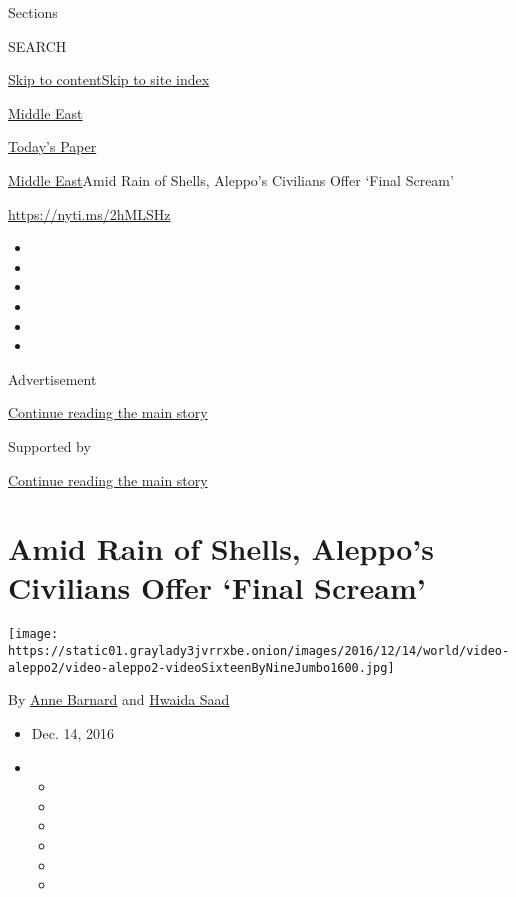 Sections

SEARCH

\protect\hyperlink{site-content}{Skip to
content}\protect\hyperlink{site-index}{Skip to site index}

\href{https://www.nytimes3xbfgragh.onion/section/world/middleeast}{Middle
East}

\href{https://myaccount.nytimes3xbfgragh.onion/auth/login?response_type=cookie\&client_id=vi}{}

\href{https://www.nytimes3xbfgragh.onion/section/todayspaper}{Today's
Paper}

\href{/section/world/middleeast}{Middle East}\textbar{}Amid Rain of
Shells, Aleppo's Civilians Offer `Final Scream'

\url{https://nyti.ms/2hMLSHz}

\begin{itemize}
\item
\item
\item
\item
\item
\item
\end{itemize}

Advertisement

\protect\hyperlink{after-top}{Continue reading the main story}

Supported by

\protect\hyperlink{after-sponsor}{Continue reading the main story}

\hypertarget{amid-rain-of-shells-aleppos-civilians-offer-final-scream}{%
\section{Amid Rain of Shells, Aleppo's Civilians Offer `Final
Scream'}\label{amid-rain-of-shells-aleppos-civilians-offer-final-scream}}

\texttt{[image: https://static01.graylady3jvrrxbe.onion/images/2016/12/14/world/video-aleppo2/video-aleppo2-videoSixteenByNineJumbo1600.jpg]}

By \href{http://www.nytimes3xbfgragh.onion/by/anne-barnard}{Anne
Barnard} and
\href{https://www.nytimes3xbfgragh.onion/by/hwaida-saad}{Hwaida Saad}

\begin{itemize}
\item
  Dec. 14, 2016
\item
  \begin{itemize}
  \item
  \item
  \item
  \item
  \item
  \item
  \end{itemize}
\end{itemize}

